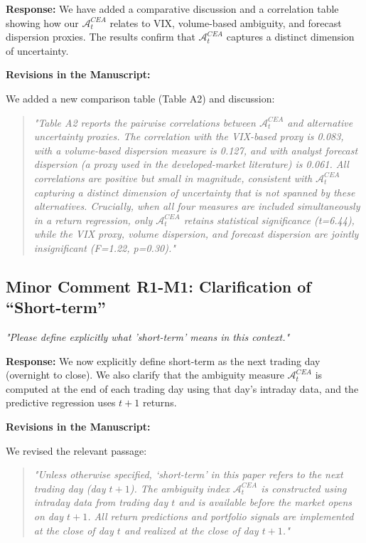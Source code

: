 \documentclass[12pt]{article}
\begin{document}
\begin{highlightbox}
\textbf{Response:} We have added a comparative discussion and a correlation table showing how our $\mathcal{A}^{CEA}_t$ relates to VIX, volume-based ambiguity, and forecast dispersion proxies. The results confirm that $\mathcal{A}^{CEA}_t$ captures a distinct dimension of uncertainty.
\end{highlightbox}

\begin{highlightbox}
\textbf{Revisions in the Manuscript:}

We added a new comparison table (Table A2) and discussion:
\vspace{0.2cm}
\begin{quote}
\itshape "Table A2 reports the pairwise correlations between $\mathcal{A}^{CEA}_t$ and alternative uncertainty proxies. The correlation with the VIX-based proxy is 0.083, with a volume-based dispersion measure is 0.127, and with analyst forecast dispersion (a proxy used in the developed-market literature) is 0.061. All correlations are positive but small in magnitude, consistent with $\mathcal{A}^{CEA}_t$ capturing a distinct dimension of uncertainty that is not spanned by these alternatives. Crucially, when all four measures are included simultaneously in a return regression, only $\mathcal{A}^{CEA}_t$ retains statistical significance (t=6.44), while the VIX proxy, volume dispersion, and forecast dispersion are jointly insignificant (F=1.22, p=0.30)."
\end{quote}
\end{highlightbox}

\subsection*{Minor Comment R1-M1: Clarification of ``Short-term''}
\textit{"Please define explicitly what 'short-term' means in this context."}

\begin{highlightbox}
\textbf{Response:} We now explicitly define short-term as the next trading day (overnight to close). We also clarify that the ambiguity measure $\mathcal{A}^{CEA}_t$ is computed at the end of each trading day using that day's intraday data, and the predictive regression uses $t+1$ returns.
\end{highlightbox}

\begin{highlightbox}
\textbf{Revisions in the Manuscript:}

We revised the relevant passage:
\vspace{0.2cm}
\begin{quote}
\itshape "Unless otherwise specified, `short-term' in this paper refers to the next trading day (day $t+1$). The ambiguity index $\mathcal{A}^{CEA}_t$ is constructed using intraday data from trading day $t$ and is available before the market opens on day $t+1$. All return predictions and portfolio signals are implemented at the close of day $t$ and realized at the close of day $t+1$."
\end{quote}
\end{highlightbox}
\end{document}
